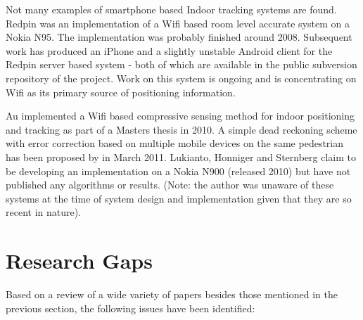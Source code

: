 Not many examples of smartphone based Indoor tracking systems are found. Redpin\cite{Redpin} was an implementation of a Wifi based room level accurate system on a Nokia N95. The implementation was probably finished around 2008. Subsequent work has produced an iPhone and a slightly unstable Android client for the Redpin server based system - both of which are available in the public subversion repository of the project. Work on this system is ongoing and is concentrating on Wifi as its primary source of positioning information.

Au \cite{Anthea} implemented a Wifi based compressive sensing method for indoor positioning and tracking as part of a Masters thesis in 2010. A simple dead reckoning scheme with error correction based on multiple mobile devices on the same pedestrian has been proposed by \cite{NUSJin} in March 2011. Lukianto, Honniger and Sternberg\cite{Lukianto} claim to be developing an implementation on a Nokia N900 (released 2010) but have not published any algorithms or results. (Note: the author was unaware of these systems at the time of system design and implementation given that they are so recent in nature).


\section{Research Gaps}

Based on a review of a wide variety of papers besides those mentioned in the previous section, the following issues have been identified:

